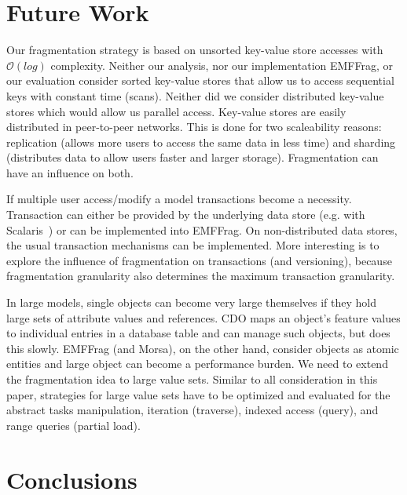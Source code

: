 \section{Future Work} 
\label{sec:future_work}

 Our fragmentation strategy is based on unsorted key-value store accesses with $\mathcal{O}(log)$ complexity. Neither our analysis, nor our  implementation EMFFrag, or our evaluation consider sorted key-value stores that allow us to access sequential keys with constant time (scans). Neither did we consider distributed key-value stores which would allow us parallel access. Key-value stores are easily distributed in peer-to-peer networks. This is done for two scaleability reasons: replication (allows more users to access the same data in less time) and sharding (distributes data to allow users faster and larger storage). Fragmentation can have an influence on both.

 If multiple user access/modify a model transactions become a necessity. Transaction can either be provided by the underlying data store (e.g. with Scalaris~\cite{ScalarisTransactions2008}) or can be implemented into EMFFrag. On non-distributed data stores, the usual transaction mechanisms can be implemented. More interesting is to explore the influence of fragmentation on transactions (and versioning), because fragmentation granularity also determines the maximum transaction granularity.

 In large models, single objects can become very large themselves if they hold large sets of attribute values and references. CDO maps an object's feature values to individual entries in a database table and can manage such objects, but does this slowly. EMFFrag (and Morsa), on the other hand, consider objects as atomic entities and large object can become a performance burden. We need to extend the fragmentation idea to large value sets. Similar to all consideration in this paper, strategies for large value sets have to be optimized and evaluated for the abstract tasks manipulation, iteration (traverse), indexed access (query), and range queries (partial load). 

\section{Conclusions}\label{sec:conclusions}


